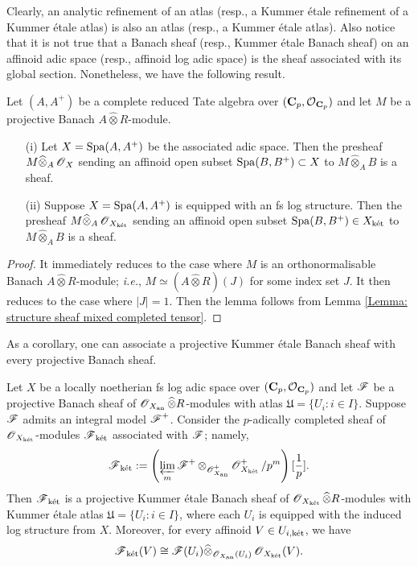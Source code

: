Clearly, an analytic refinement of an atlas (resp., a Kummer \'etale refinement of a Kummer \'etale atlas) is also an atlas (resp., a Kummer \'etale atlas). Also notice that it is not true that a Banach sheaf (resp., Kummer \'etale Banach sheaf) on an affinoid adic space (resp., affinoid log adic space) is the sheaf associated with its global section. Nonetheless, we have the following result.

\begin{Lemma}\label{Lemma: Banach sheaf associated with global section}
Let $(A, A^+)$ be a complete reduced Tate algebra over $(\operatorname{\mathbf{C}}_p, \operatorname{\mathcal{O}}_{\operatorname{\mathbf{C}}_p})$ and let $M$ be a projective Banach $A\widehat{\otimes}R$-module.
\begin{enumerate}
\item[(i)] Let $X=\operatorname{Spa}(A, A^+)$ be the associated adic space. Then the presheaf $M\widehat{\otimes}_A \operatorname{\mathscr{O}}_X$ sending an affinoid open subset $\operatorname{Spa}(B, B^+)\subset X$ to $M\widehat{\otimes}_A B$ is a sheaf.
\item[(ii)] Suppose $X=\operatorname{Spa}(A, A^+)$ is equipped with an fs log structure. Then the presheaf $M\widehat{\otimes}_A \operatorname{\mathscr{O}}_{X_{\operatorname{\textrm{k\'{e}t}}}}$ sending an affinoid open subset $\operatorname{Spa}(B, B^+)\in X_{\operatorname{\textrm{k\'{e}t}}}$ to $M\widehat{\otimes}_A B$ is a sheaf.
\end{enumerate}
\end{Lemma}

\begin{proof}
It immediately reduces to the case where $M$ is an orthonormalisable Banach $A\widehat{\otimes}R$-module; \emph{i.e.}, $M\simeq (A\widehat{\otimes}R)(J)$ for some index set $J$. It then reduces to the case where $|J|=1$. Then the lemma follows from Lemma \ref{Lemma: structure sheaf mixed completed tensor}.
\end{proof}

As a corollary, one can associate a projective Kummer \'etale Banach sheaf with every projective Banach sheaf.

\begin{Corollary}\label{Corollary: Banach induce Kummer etale Banach}
Let $X$ be a locally noetherian fs log adic space over $(\operatorname{\mathbf{C}}_p, \operatorname{\mathcal{O}}_{\operatorname{\mathbf{C}}_p})$ and let $\operatorname{\mathscr{F}}$ be a projective Banach sheaf of $\operatorname{\mathscr{O}}_{X_{\operatorname{an}}}\widehat{\otimes}R$-modules with atlas $\mathfrak{U}=\{U_i: i\in I\}$. Suppose $\operatorname{\mathscr{F}}$ admits an integral model $\operatorname{\mathscr{F}}^+$. Consider the $p$-adically completed sheaf of $\operatorname{\mathscr{O}}_{X_{\operatorname{\textrm{k\'{e}t}}}}$-modules $\operatorname{\mathscr{F}}_{\operatorname{\textrm{k\'{e}t}}}$ associated with $\operatorname{\mathscr{F}}$; namely, 
\[\operatorname{\mathscr{F}}_{\operatorname{\textrm{k\'{e}t}}}:=\left(\varprojlim_m \operatorname{\mathscr{F}}^+\otimes_{\operatorname{\mathscr{O}}^+_{X_{\operatorname{an}}}}\operatorname{\mathscr{O}}^+_{X_{\operatorname{\textrm{k\'{e}t}}}}/p^m\right)[\frac{1}{p}].\]
Then $\operatorname{\mathscr{F}}_{\operatorname{\textrm{k\'{e}t}}}$ is a projective Kummer \'etale Banach sheaf of $\operatorname{\mathscr{O}}_{X_{\operatorname{\textrm{k\'{e}t}}}}\widehat{\otimes}R$-modules with Kummer \'etale atlas $\mathfrak{U}=\{U_i: i\in I\}$, where each $U_i$ is equipped with the induced log structure from $X$. Moreover, for every affinoid $V\in U_{i, \operatorname{\textrm{k\'{e}t}}}$, we have
\[\operatorname{\mathscr{F}}_{\operatorname{\textrm{k\'{e}t}}}(V)\cong \operatorname{\mathscr{F}}(U_i)\widehat{\otimes}_{\operatorname{\mathscr{O}}_{X_{\operatorname{an}}}(U_i)}\operatorname{\mathscr{O}}_{X_{\operatorname{\textrm{k\'{e}t}}}}(V).\]
\end{Corollary}

